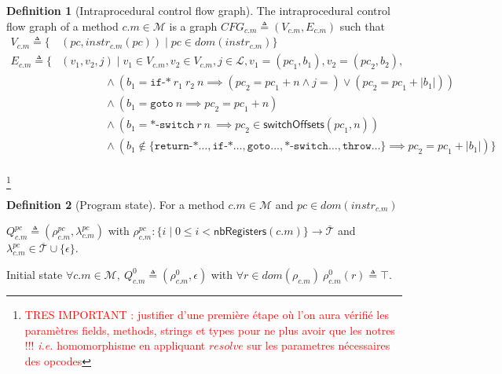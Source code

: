 \documentclass[english,dvips,ps2pdf,11pt]{article}
\theoremstyle{definition}
\newtheorem{definition}{Definition}[section]
\newcommand{\todo}[1]{\footnote{\textcolor{red}{#1}}}
\newcommand{\var}[1]{\ensuremath{\mathit{#1}}\xspace}
\newcommand{\func}[1]{\ensuremath{\mathsf{#1}}\xspace}
\newcommand{\bcode}[1]{\texttt{#1}\xspace}
\newcommand{\types}[0]{\ensuremath{\overline{\mathcal{T}}}\xspace}
\newcommand{\methods}[0]{\ensuremath{\mathcal{M}}\xspace}
\newcommand{\jumps}[0]{\ensuremath{\mathcal{L}}\xspace}
\newcommand{\instruction}[1]{\ensuremath{\var{instr}_{#1}}\xspace}
\newcommand{\resolve}[0]{\var{resolve}}
\newcommand{\nbregisters}[0]{\func{nbRegisters}}
\newcommand{\switchoffsets}[0]{\func{switchOffsets}}
\newcommand{\rvoid}[0]{\ensuremath{\epsilon}\xspace}
\newcommand{\registers}[0]{\ensuremath{\rho}\xspace}
\newcommand{\lastresult}[0]{\ensuremath{\lambda}\xspace}
\newcommand{\ie}[0]{\textit{i.e.}\xspace}
\begin{document}
\begin{definition}[Intraprocedural control flow graph]
  The intraprocedural control flow graph of a method $c.m \in \methods$
  is a graph $CFG_{c.m} \triangleq (V_{c.m}, E_{c.m})$ such that
  \begin{align*}
    V_{c.m} \triangleq \{ & (\var{pc}, \instruction{c.m}(\var{pc})) \mid \var{pc} \in \var{dom}(\instruction{c.m})\}\\
    E_{c.m} \triangleq \{ & (v_1, v_2, j) \mid v_1 \in V_{c.m}, v_2 \in V_{c.m}, j \in \jumps, v_1 = (\var{pc}_1, b_1), v_2 = (\var{pc}_2, b_2),\\
    &\quad\quad\quad\quad\wedge (b_1 = \bcode{if-*}\ r_1\ r_2\ n \implies (\var{pc}_2 = \var{pc}_1 + n \wedge j = ) \vee (\var{pc}_2 = \var{pc}_1 + |b_1|)) \\
    &\quad\quad\quad\quad\wedge (b_1 = \bcode{goto}\ n \implies \var{pc}_2 = \var{pc}_1 + n)\\
    &\quad\quad\quad\quad\wedge (b_1 = \bcode{*-switch}\ r\ n\ \implies \var{pc}_2 \in \switchoffsets(\var{pc}_1, n))\\
    &\quad\quad\quad\quad\wedge (b_1 \notin \{ \bcode{return-*}\dots, \bcode{if-*}\dots, \bcode{goto}\dots, \bcode{*-switch}\dots, \bcode{throw}\dots \} \implies \var{pc}_2 = \var{pc}_1 + |b_1|) \}\\
  \end{align*}
\end{definition}




\todo{TRES IMPORTANT : justifier d'une première étape où l'on aura vérifié les paramètres fields, methods, strings et types pour ne plus avoir que les notres !!! \ie homomorphisme en appliquant \resolve sur les parametres nécessaires des opcodes}



\begin{definition}[Program state]
  
  For a method $c.m \in \methods$ and $\var{pc} \in \var{dom}(\instruction{c.m})$

  $Q_{c.m}^\var{pc} \triangleq (\registers_{c.m}^\var{pc}, \lastresult_{c.m}^\var{pc})$
  with
  $\registers_{c.m}^\var{pc}: \{ i \mid 0 \leq i < \nbregisters(c.m)\} \longrightarrow \types$ and $\lastresult_{c.m}^\var{pc} \in \types \cup \{\rvoid\}$.

  Initial state
  $\forall c.m \in \methods,\ Q_{c.m}^0 \triangleq (\registers_{c.m}^0, \rvoid)$ with
  $\forall r \in \var{dom}(\registers_{c.m})\ \registers_{c.m}^0(r) \triangleq \top$.

  
\end{definition}
\end{document}
